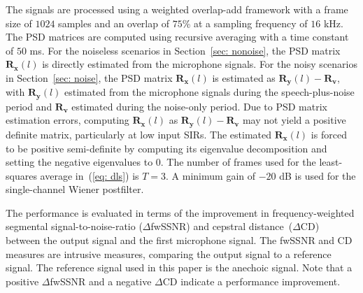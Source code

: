 \documentclass{article}
\begin{document}
The signals are processed using a weighted overlap-add framework with a frame size of $1024$ samples and an overlap of $75$\% at a sampling frequency of $16$ kHz.
The PSD matrices are computed using recursive averaging with a time constant of $50$ ms.
For the noiseless scenarios in Section~\ref{sec: nonoise}, the PSD matrix $\mathbf{R}_{\mathbf{x}}(l)$ is directly estimated from the microphone signals.
For the noisy scenarios in Section~\ref{sec: noise}, the PSD matrix $\mathbf{R}_{\mathbf{x}}(l)$ is estimated as $\mathbf{R}_{\mathbf{y}}(l) - \mathbf{R}_{\mathbf{v}}$, with $\mathbf{R}_{\mathbf{y}}(l)$ estimated from the microphone signals during the speech-plus-noise period and $\mathbf{R}_{\mathbf{v}}$ estimated during the noise-only period.
Due to PSD matrix estimation errors, computing $\mathbf{R}_{\mathbf{x}}(l)$ as $\mathbf{R}_{\mathbf{y}}(l) - \mathbf{R}_{\mathbf{v}}$ may not yield a positive definite matrix, particularly at low input SIRs.
The estimated $\mathbf{R}_{\mathbf{x}}(l)$ is forced to be positive semi-definite by computing its eigenvalue decomposition and setting the negative eigenvalues to $0$.
The number of frames used for the least-squares average in~(\ref{eq: dls}) is $T = 3$.
A minimum gain of $-20$ dB is used for the single-channel Wiener postfilter.

The performance is evaluated in terms of the improvement in frequency-weighted segmental signal-to-noise-ratio ($\Delta$fwSSNR) \cite{Hu_ITASLP_2008} and cepstral distance~($\Delta$CD)~\cite{Quackenbush_book} between the output signal and the first microphone signal.
The fwSSNR and CD measures are intrusive measures, comparing the output signal to a reference signal. 
The reference signal used in this paper is the anechoic signal.
Note that a positive $\Delta$fwSSNR and a negative $\Delta$CD indicate a performance improvement.
\end{document}
